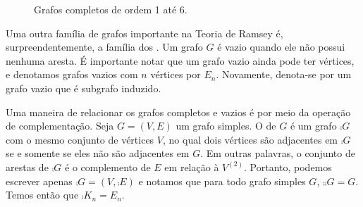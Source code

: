 \begin{figure}[h!]
\centering
{}
\caption{Grafos completos de ordem 1 até 6.}
\label{fig:complete}
\end{figure}

Uma outra família de grafos importante na Teoria de Ramsey é, surpreendentemente, a família dos . Um grafo $G$ é vazio quando ele não possui nenhuma aresta. É importante notar que um grafo vazio ainda pode ter vértices, e denotamos grafos vazios com $n$ vértices por $E_n$. Novamente, denota-se por  um grafo vazio que é subgrafo induzido.

Uma maneira de relacionar os grafos completos e vazios é por meio da operação de complementação. Seja $G = (V,E)$ um grafo simples. O  de $G$ é um grafo $\comp{G}$ com o mesmo conjunto de vértices $V$, no qual dois vértices são adjacentes em $\comp{G}$ se e somente se eles não são adjacentes em $G$. Em outras palavras, o conjunto de arestas de $\comp{G}$ é o complemento de $E$ em relação à $V^{(2)}$. Portanto, podemos escrever apenas $\comp{G} = (V,\comp{E})$ e notamos que para todo grafo simples $G$, $\comp{\comp{G}} = G$. Temos então que $\comp{K_n} = E_n$.

